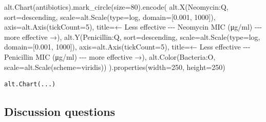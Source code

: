\documentclass[
  letterpaper,
  DIV=11,
  numbers=noendperiod]{scrartcl}
\newenvironment{Shaded}{\begin{snugshade}}{\end{snugshade}}
\newcommand{\BuiltInTok}[1]{\textcolor[rgb]{0.00,0.23,0.31}{#1}}
\newcommand{\DecValTok}[1]{\textcolor[rgb]{0.68,0.00,0.00}{#1}}
\newcommand{\FloatTok}[1]{\textcolor[rgb]{0.68,0.00,0.00}{#1}}
\newcommand{\NormalTok}[1]{\textcolor[rgb]{0.00,0.23,0.31}{#1}}
\newcommand{\OperatorTok}[1]{\textcolor[rgb]{0.37,0.37,0.37}{#1}}
\newcommand{\StringTok}[1]{\textcolor[rgb]{0.13,0.47,0.30}{#1}}
\begin{document}
\begin{Shaded}
\begin{Highlighting}[]
\NormalTok{alt.Chart(antibiotics).mark\_circle(size}\OperatorTok{=}\DecValTok{80}\NormalTok{).encode(}
\NormalTok{    alt.X(}\StringTok{\textquotesingle{}Neomycin:Q\textquotesingle{}}\NormalTok{,}
\NormalTok{          sort}\OperatorTok{=}\StringTok{\textquotesingle{}descending\textquotesingle{}}\NormalTok{,}
\NormalTok{          scale}\OperatorTok{=}\NormalTok{alt.Scale(}\BuiltInTok{type}\OperatorTok{=}\StringTok{\textquotesingle{}log\textquotesingle{}}\NormalTok{, domain}\OperatorTok{=}\NormalTok{[}\FloatTok{0.001}\NormalTok{, }\DecValTok{1000}\NormalTok{]),}
\NormalTok{          axis}\OperatorTok{=}\NormalTok{alt.Axis(tickCount}\OperatorTok{=}\DecValTok{5}\NormalTok{),}
\NormalTok{          title}\OperatorTok{=}\StringTok{\textquotesingle{}← Less effective {-}{-}{-} Neomycin MIC (μg/ml) {-}{-}{-} more effective →\textquotesingle{}}\NormalTok{),}
\NormalTok{    alt.Y(}\StringTok{\textquotesingle{}Penicillin:Q\textquotesingle{}}\NormalTok{,}
\NormalTok{          sort}\OperatorTok{=}\StringTok{\textquotesingle{}descending\textquotesingle{}}\NormalTok{,}
\NormalTok{          scale}\OperatorTok{=}\NormalTok{alt.Scale(}\BuiltInTok{type}\OperatorTok{=}\StringTok{\textquotesingle{}log\textquotesingle{}}\NormalTok{, domain}\OperatorTok{=}\NormalTok{[}\FloatTok{0.001}\NormalTok{, }\DecValTok{1000}\NormalTok{]),}
\NormalTok{          axis}\OperatorTok{=}\NormalTok{alt.Axis(tickCount}\OperatorTok{=}\DecValTok{5}\NormalTok{),}
\NormalTok{          title}\OperatorTok{=}\StringTok{\textquotesingle{}← Less effective {-}{-}{-} Penicillin MIC (μg/ml) {-}{-}{-} more effective →\textquotesingle{}}\NormalTok{),}
\NormalTok{    alt.Color(}\StringTok{\textquotesingle{}Bacteria:O\textquotesingle{}}\NormalTok{,}
\NormalTok{          scale}\OperatorTok{=}\NormalTok{alt.Scale(scheme}\OperatorTok{=}\StringTok{\textquotesingle{}viridis\textquotesingle{}}\NormalTok{))}
\NormalTok{).properties(width}\OperatorTok{=}\DecValTok{250}\NormalTok{, height}\OperatorTok{=}\DecValTok{250}\NormalTok{)}
\end{Highlighting}
\end{Shaded}

\begin{verbatim}
alt.Chart(...)
\end{verbatim}

\subsection{Discussion questions}\label{discussion-questions}
\end{document}
